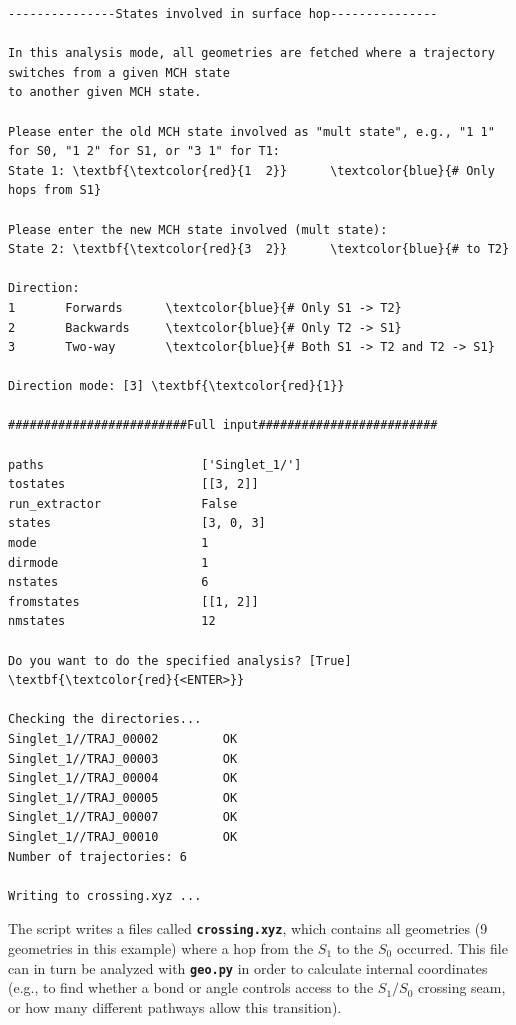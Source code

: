\documentclass[a4paper,11pt,DIV=15,openany]{scrbook}
\newcommand{\ttt}[1]{\textbf{\texttt{#1}}}
\begin{document}
\begin{oframed}
\begin{Verbatim}[commandchars=\\\{\}]
---------------States involved in surface hop---------------

In this analysis mode, all geometries are fetched where a trajectory switches from a given MCH state
to another given MCH state.

Please enter the old MCH state involved as "mult state", e.g., "1 1" for S0, "1 2" for S1, or "3 1" for T1:
State 1: \textbf{\textcolor{red}{1  2}}      \textcolor{blue}{# Only hops from S1}

Please enter the new MCH state involved (mult state):
State 2: \textbf{\textcolor{red}{3  2}}      \textcolor{blue}{# to T2}

Direction:
1       Forwards      \textcolor{blue}{# Only S1 -> T2}
2       Backwards     \textcolor{blue}{# Only T2 -> S1}
3       Two-way       \textcolor{blue}{# Both S1 -> T2 and T2 -> S1}

Direction mode: [3] \textbf{\textcolor{red}{1}}

#########################Full input#########################

paths                      ['Singlet_1/']
tostates                   [[3, 2]]
run_extractor              False
states                     [3, 0, 3]
mode                       1
dirmode                    1
nstates                    6
fromstates                 [[1, 2]]
nmstates                   12

Do you want to do the specified analysis? [True] \textbf{\textcolor{red}{<ENTER>}}

Checking the directories...
Singlet_1//TRAJ_00002         OK
Singlet_1//TRAJ_00003         OK
Singlet_1//TRAJ_00004         OK
Singlet_1//TRAJ_00005         OK
Singlet_1//TRAJ_00007         OK
Singlet_1//TRAJ_00010         OK
Number of trajectories: 6

Writing to crossing.xyz ...
\end{Verbatim}
\end{oframed}

\normalsize
The script writes a files called \ttt{crossing.xyz}, which contains all geometries (9 geometries in this example) where a hop from the $S_1$ to the $S_0$ occurred.
This file can in turn be analyzed with \ttt{geo.py} in order to calculate internal coordinates (e.g., to find whether a bond or angle controls access to the $S_1/S_0$ crossing seam, or how many different pathways allow this transition). 

\end{document}
